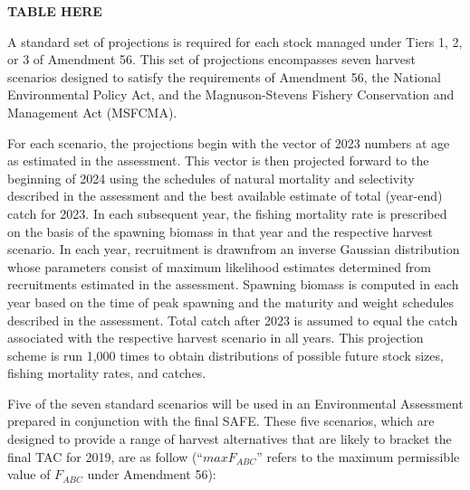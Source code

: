 \documentclass[
  11pt,
]{article}
\begin{document}
\textbf{TABLE HERE}

A standard set of projections is required for each stock managed under Tiers 1, 2, or 3 of Amendment 56.
This set of projections encompasses seven harvest scenarios designed to satisfy the requirements of Amendment 56, the National Environmental Policy Act, and the Magnuson-Stevens Fishery Conservation and Management Act (MSFCMA).

For each scenario, the projections begin with the vector of 2023 numbers at age as estimated in the assessment.
This vector is then projected forward to the beginning of 2024 using the schedules of natural mortality and selectivity described in the assessment and the best available estimate of total (year-end) catch for 2023.
In each subsequent year, the fishing mortality rate is prescribed on the basis of the spawning biomass in that year and the respective harvest scenario.
In each year, recruitment is drawnfrom an inverse Gaussian distribution whose parameters consist of maximum likelihood estimates determined from recruitments estimated in the assessment.
Spawning biomass is computed in each year based on the time of peak spawning and the maturity and weight schedules described in the assessment.
Total catch after 2023 is assumed to equal the catch associated with the respective harvest scenario in all years.
This projection scheme is run 1,000 times to obtain distributions of possible future stock sizes, fishing mortality rates, and catches.

Five of the seven standard scenarios will be used in an Environmental Assessment prepared in conjunction with the final SAFE.
These five scenarios, which are designed to provide a range of harvest alternatives that are likely to bracket the final TAC for 2019, are as follow (``\(max F_{ABC}\)'' refers to the maximum permissible value of \(F_{ABC}\) under Amendment 56):
\end{document}
